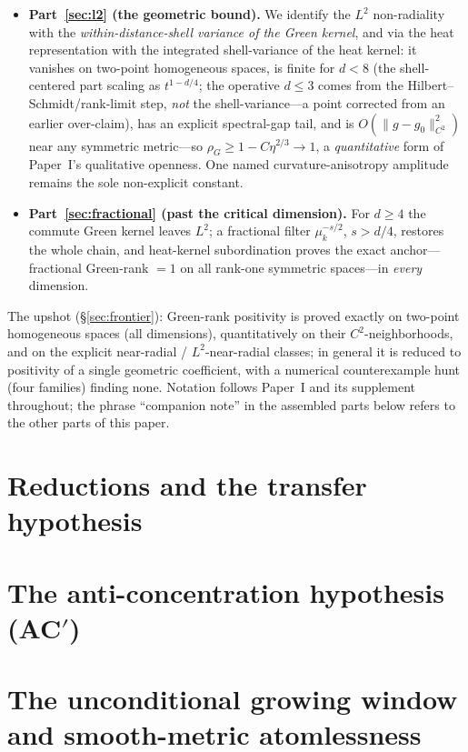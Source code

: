 \documentclass[11pt]{article}
\theoremstyle{remark}
\begin{document}
\begin{itemize}
\item \textbf{Part~\ref{sec:l2} (the geometric bound).} We identify the $L^2$ non-radiality
with the \emph{within-distance-shell variance of the Green kernel}, and via the heat
representation with the integrated shell-variance of the heat kernel: it vanishes on
two-point homogeneous spaces, is finite for $d<8$ (the shell-centered part scaling as
$t^{1-d/4}$; the operative $d\le3$ comes from the Hilbert--Schmidt/rank-limit step, \emph{not}
the shell-variance---a point corrected from an earlier over-claim), has an explicit
spectral-gap tail, and is
$O(\lVert g-g_0\rVert_{C^2}^2)$ near any symmetric metric---so $\rho_G\ge1-C\eta^{2/3}\to1$, a
\emph{quantitative} form of Paper~I's qualitative openness. One named curvature-anisotropy
amplitude remains the sole non-explicit constant.

\item \textbf{Part~\ref{sec:fractional} (past the critical dimension).} For $d\ge4$ the
commute Green kernel leaves $L^2$; a fractional filter $\mu_k^{-s/2}$, $s>d/4$, restores the
whole chain, and heat-kernel subordination proves the exact anchor---fractional Green-rank
$=1$ on all rank-one symmetric spaces---in \emph{every} dimension.
\end{itemize}

The upshot (\S\ref{sec:frontier}): Green-rank positivity is proved exactly on two-point
homogeneous spaces (all dimensions), quantitatively on their $C^2$-neighborhoods, and on the
explicit near-radial / $L^2$-near-radial classes; in general it is reduced to positivity of a
single geometric coefficient, with a numerical counterexample hunt (four families) finding
none. Notation follows Paper~I and its supplement throughout; the phrase ``companion note''
in the assembled parts below refers to the other parts of this paper.

\section{Reductions and the transfer hypothesis}\label{sec:reductions}


\section{The anti-concentration hypothesis (AC$'$)}\label{sec:ac}


\section{The unconditional growing window and smooth-metric atomlessness}\label{sec:summit}

\end{document}
